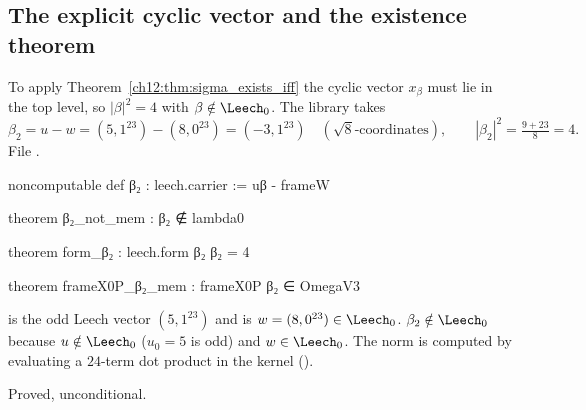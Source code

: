 \subsection{The explicit cyclic vector and the existence theorem}

To apply Theorem~\ref{ch12:thm:sigma_exists_iff} the cyclic vector $x_\beta$ must lie in the top
level, so $|\beta|^2=4$ with $\beta\notin\Leech_0$.  The library takes
\begin{equation*}
 \beta_2 = u - w = (5,1^{23})-(8,0^{23}) = (-3,1^{23})\quad(\sqrt8\text{-coordinates}),\qquad
 |\beta_2|^2=\tfrac{9+23}{8}=4 .
\end{equation*}
File .
\begin{leancode}
noncomputable def β₂ : leech.carrier := uβ - frameW

theorem β₂_not_mem : β₂ ∉ lambda0

theorem form_β₂ : leech.form β₂ β₂ = 4

theorem frameX0P_β₂_mem : frameX0P β₂ ∈ OmegaV3
\end{leancode}
\begin{dictionary}
 is the odd Leech vector $(5,1^{23})$ and  is $w=(8,0^{23})\in\Leech_0$.
$\beta_2\notin\Leech_0$ because $u\notin\Leech_0$ ($u_0=5$ is odd) and $w\in\Leech_0$.  The norm is
computed by evaluating a $24$-term dot product in the kernel ().
\end{dictionary}
\begin{status}Proved, unconditional.\end{status}

